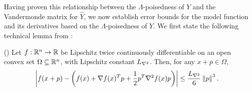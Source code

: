 \documentclass{article}
\begin{document}
Having proven this relationship between the $\Lambda$-poisedness of $Y$ and the Vandermonde matrix for $\hat{Y}$,  we now establish error bounds for the model function and its derivatives based on the $\Lambda$-poisedness of $Y$.   We first state the following technical lemma from \cite{dennisschnabel1983}:
\begin{lemma}(\cite[Lemma 4.1.14]{dennisschnabel1983})
\label{4_1_14}
Let $f : \mathbb R^n \to \mathbb R$ be Lipschitz twice continuously differentiable on an open convex set $\Omega \subseteq \mathbb R^n$,
with Lipschitz constant ${L_{\nabla^2}}$.
Then, for any $x + p\in \Omega$,
\begin{align*}
\left|f(x + p) - \left(f(x) + \nabla f(x)^T p + \frac 1 2 p^T \nabla^2 f(x)p\right) \right|
\le \frac {{L_{\nabla^2}}} 6 \left\|p\right\|^3.
\end{align*}
\end{lemma}
\end{document}

